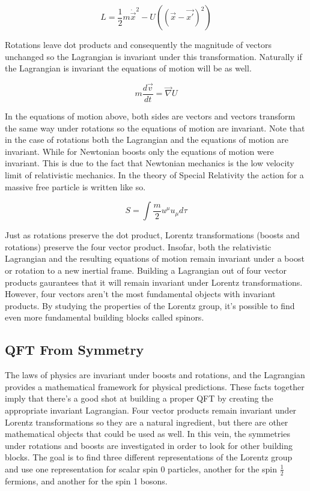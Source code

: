 \begin{equation}
L = \frac{1}{2} m\dot{\vec{x}}^2 - U((\vec{x} - \vec{x'})^2)
\end{equation}

Rotations leave dot products and consequently the magnitude of vectors unchanged so the Lagrangian is invariant under this transformation. Naturally if the Lagrangian is invariant the equations of motion will be as well.

\begin{equation}
m\frac{d\vec{v}}{dt} = \vec{\nabla} U
\end{equation}

In the equations of motion above, both sides are vectors and vectors transform the same way under rotations so the equations of motion are invariant. Note that in the case of rotations both the Lagrangian and the equations of motion are invariant. While for Newtonian boosts only the equations of motion were invariant. This is due to the fact that Newtonian mechanics is the low velocity limit of relativistic mechanics. In the theory of Special Relativity the action for a massive free particle is written like so.

\begin{equation}
S = \int \frac{m}{2}u^{\mu}u_{\mu}d\tau
\end{equation}

Just as rotations preserve the dot product, Lorentz transformations (boosts and rotations) preserve the four vector product. Insofar, both the relativistic Lagrangian and the resulting equations of motion remain invariant under a boost or rotation to a new inertial frame. Building a Lagrangian out of four vector products gaurantees that it will remain invariant under Lorentz transformations. However, four vectors aren't the most fundamental objects with invariant products. By studying the properties of the Lorentz group, it's possible to find even more fundamental building blocks called spinors.

\subsection{QFT From Symmetry}

The laws of physics are invariant under boosts and rotations, and the Lagrangian provides a mathematical framework for physical predictions. These facts together imply that there's a good shot at building a proper QFT by creating the appropriate invariant Lagrangian. Four vector products remain invariant under Lorentz transformations so they are a natural ingredient, but there are other mathematical objects that could be used as well. In this vein, the symmetries under rotations and boosts are investigated in order to look for other building blocks. The goal is to find three different representations of the Lorentz group and use one representation for scalar spin 0 particles, another for the spin $\frac{1}{2}$ fermions, and another for the spin 1 bosons.

